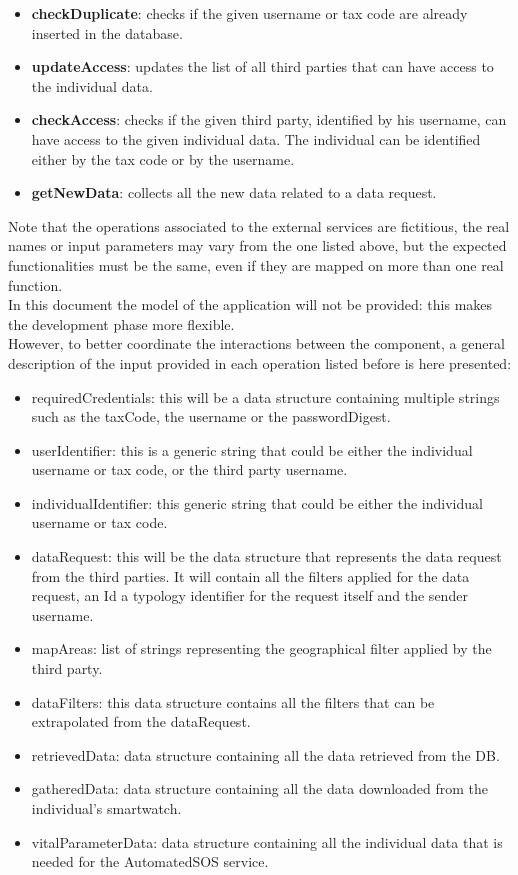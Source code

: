 \begin{itemize}
\begin{itemize}
\item \textbf{checkDuplicate}: checks if the given username or tax code are already inserted in the database.
\item \textbf{updateAccess}: updates the list of all third parties that can have access to the individual data.
\item \textbf{checkAccess}: checks if the given third party, identified by his username, can have access to the given individual data. The individual can be identified either by the tax code or by the username.
\item \textbf{getNewData}: collects all the new data related to a data request.
\end{itemize}
\end{itemize}
Note that the operations associated to the external services are fictitious, the real names or input parameters may vary from the one listed above, but the expected functionalities must be the same, even if they are mapped on more than one real function.\\

In this document the model of the application will not be provided: this makes the development phase more flexible.\\
However, to better coordinate the interactions between the component, a general description of the input provided in each operation listed before is here presented:
\begin{itemize}
\item requiredCredentials: this will be a data structure containing multiple strings such as the taxCode, the username or the passwordDigest.
\item userIdentifier: this is a generic string that could be either the individual username or tax code, or the third party username.
\item individualIdentifier: this generic string that could be either the individual username or tax code.
\item dataRequest: this will be the data structure that represents the data request from the third parties. It will contain all the filters applied for the data request, an Id a typology identifier for the request itself and the sender username.
\item mapAreas: list of strings representing the geographical filter applied by the third party.
\item dataFilters: this data structure contains all the filters that can be extrapolated from the dataRequest.
\item retrievedData: data structure containing all the data retrieved from the DB.
\item gatheredData: data structure containing all the data downloaded from the individual's smartwatch.
\item vitalParameterData: data structure containing all the individual data that is needed for the AutomatedSOS service.
\end{itemize}




